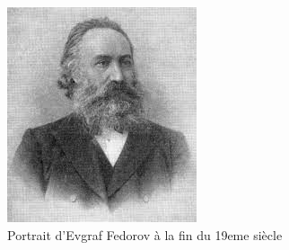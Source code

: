 \documentclass{article}
\begin{document}
\begin{figure} [!h]
    \center
    \includegraphics [scale=0.5] {image/Fedorov.jpg}
    \caption{Portrait d'Evgraf Fedorov à la fin du 19eme siècle}
\end{figure}

\nocite{*}

\end{document}
